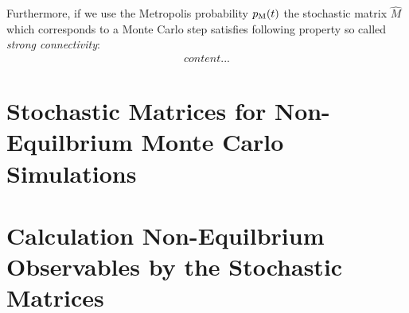 Furthermore, if we use the Metropolis probability $p_{\rm M}(t)$ the stochastic matrix $\hat{M}$ which corresponds to a Monte Carlo step satisfies following property so called \textit{strong connectivity}:
\begin{align}
content...
\end{align}

\section{Stochastic Matrices for Non-Equilbrium Monte Carlo Simulations}

\section{Calculation Non-Equilbrium Observables by the Stochastic Matrices}